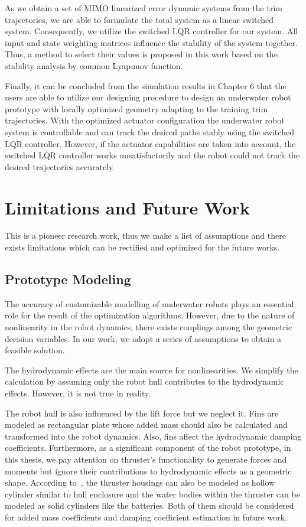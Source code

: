 As we obtain a set of MIMO linearized error dynamic systems from the trim trajectories, we are able to formulate the total system as a linear switched system. Consequently, we utilize the switched LQR controller for our system. All input and state weighting matrices influence the stability of the system together.  
Thus, a method to select their values is proposed in this work based on the stability analysis by common Lyapunov function. 

Finally, it can be concluded from the simulation results in Chapter 6 that the users are able to utilize our designing procedure to design an underwater robot prototype with locally optimized geometry adapting to the training trim trajectories. With the optimized actuator configuration the underwater robot system is controllable and can track the desired paths stably using the switched LQR controller. However, if the actuator capabilities are taken into account, the switched LQR controller works unsatisfactorily and the robot could not track the desired trajectories accurately.
 
\section{Limitations and Future Work}
This is a pioneer research work, thus we make a list of assumptions and there exists limitations which can be rectified and optimized for the future works.
\subsection{Prototype Modeling}
The accuracy of customizable modelling of underwater robots plays an essential role for the result of the optimization algorithms. However, due to the nature of nonlinearity in the robot dynamics, there exists couplings among the geometric decision variables. In our work, we adopt a series of assumptions to obtain a feasible solution.

The hydrodynamic effects are the main source for nonlinearities. We simplify the  calculation by assuming only the robot hull contributes to the hydrodynamic effects. However, it is not true in reality.

The robot hull is also influenced by the lift force but we neglect it.  Fins are modeled as rectangular plate whose added mass should also be calculated and transformed into the robot dynamics. Also, fins affect the hydrodynamic damping coefficients. Furthermore, as a significant component of the robot prototype, in this thesis, we pay attention on thruster's functionality to generate forces and moments but ignore their contributions to hydrodynamic effects as a geometric shape. According to~\cite{Sia1999}, the thruster housings can also be modeled as hollow cylinder similar to hull enclosure and the water bodies within the thruster can be modeled as solid cylinders like the batteries. Both of them should be considered for added mass coefficients and damping coefficient estimation in future work.

